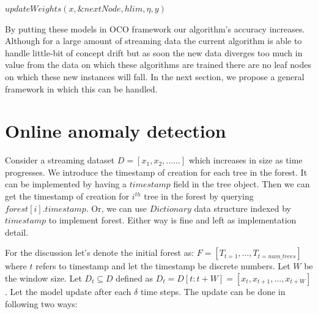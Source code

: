 \vspace{1em}
\begin{algorithm}[H]
    \caption{$updateWeights(x, T, \eta, y)$}
    \label{alg:update-weights-pidforest}
    \DontPrintSemicolon
    \SetAlgoLined


    
    $updateWeights(x, \&nextNode, hlim, \eta, y)$
\end{algorithm}
\pagebreak

By putting these models in OCO framework our algorithm's accuracy increases. 
Although for a large amount of streaming data the current algorithm is able to handle little-bit of concept drift but as soon the new data diverges too much in value from the data on which these algorithms are trained there are no leaf nodes on which these new instances will fall.
In the next section, we propose a general framework in which this can be handled.

\section{Online anomaly detection}
\label{sec:online-anomaly-detection}


Consider a streaming dataset $D = [x_1, x_2, \dots \dots  ]$ which increases in size as time progresses.
We introduce the timestamp of creation for each tree in the forest.
It can be implemented by having a $timestamp$ field in the tree object.
Then we can get the timestamp of creation for $i^{th}$ tree in the forest by querying $forest[i].timestamp$.
Or, we can use $Dictionary$ data structure indexed by $timestamp$ to implement forest.
Either way is fine and left as implementation detail.

For the discussion let's denote the initial forest as: $F = [T_{t=1}, \dots, T_{t=num\_trees}]$ where $t$ refers to timestamp and let the timestamp be discrete numbers.
Let $W$ be the window size.
Let $D_{t} \subseteq D$ defined as $D_{t} = D[t:t+W] = [x_t, x_{t+1}, \dots, x_{t+W}]$.
Let the model update after each $\delta$ time steps.
The update can be done in following two ways:

